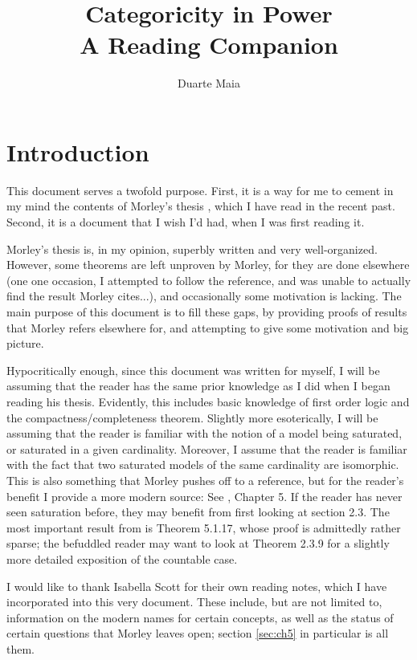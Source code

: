 \documentclass{article}
\title{Categoricity in Power\\[0.2em] \large A Reading Companion}
\author{Duarte Maia}
\theoremstyle{nonumberplain}
\begin{document}
\maketitle

\tableofcontents

\section{Introduction}

This document serves a twofold purpose. First, it is a way for me to cement in my mind the contents of Morley's thesis \cite{morley}, which I have read in the recent past. Second, it is a document that I wish I'd had, when I was first reading it.

Morley's thesis is, in my opinion, superbly written and very well-organized. However, some theorems are left unproven by Morley, for they are done elsewhere (one one occasion, I attempted to follow the reference, and was unable to actually find the result Morley cites...), and occasionally some motivation is lacking. The main purpose of this document is to fill these gaps, by providing proofs of results that Morley refers elsewhere for, and attempting to give some motivation and big picture.

Hypocritically enough, since this document was written for myself, I will be assuming that the reader has the same prior knowledge as I did when I began reading his thesis. Evidently, this includes basic knowledge of first order logic and the compactness/completeness theorem. Slightly more esoterically, I will be assuming that the reader is familiar with the notion of a model being saturated, or saturated in a given cardinality. Moreover, I assume that the reader is familiar with the fact that two saturated models of the same cardinality are isomorphic. This is also something that Morley pushes off to a reference, but for the reader's benefit I provide a more modern source: See \cite{cnk}, Chapter 5. If the reader has never seen saturation before, they may benefit from first looking at section 2.3. The most important result from \cite{cnk} is Theorem 5.1.17, whose proof is admittedly rather sparse; the befuddled reader may want to look at Theorem 2.3.9 for a slightly more detailed exposition of the countable case.

I would like to thank Isabella Scott for their own reading notes, which I have incorporated into this very document. These include, but are not limited to, information on the modern names for certain concepts, as well as the status of certain questions that Morley leaves open; section \ref{sec:ch5} in particular is all them.
\end{document}
